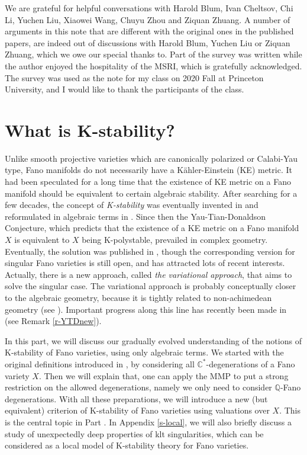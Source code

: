 \documentclass[12pt,reqno]{amsart}%
\theoremstyle{definition}
\theoremstyle{remark}
\begin{document}
\bigskip

 We are grateful for helpful conversations with Harold Blum, Ivan Cheltsov, Chi Li, Yuchen Liu, Xiaowei Wang, Chuyu Zhou and Ziquan Zhuang. A number of arguments in this note that are different with the original ones in the published papers, are indeed out of discussions with Harold Blum, Yuchen Liu or Ziquan Zhuang, which we owe our special thanks to. 
Part of the survey was written while the author enjoyed the hospitality of the MSRI, which is gratefully acknowledged. The survey was  used as the note for my class on 2020 Fall at Princeton University, and I would like to thank the participants of the class. 
\clearpage


\part{What is K-stability?}\label{p-what}
Unlike smooth projective varieties which are canonically polarized or Calabi-Yau type, Fano manifolds do not necessarily have a K\"ahler-Einstein (KE) metric. 
It had been speculated for a long time that the existence of KE metric on a Fano manifold should be equivalent to certain algebraic stability. After searching for a few decades, the concept of {\it K-stability} was eventually invented in \cite{Tia97} and reformulated in algebraic terms in \cite{Don02}. Since then the Yau-Tian-Donaldson Conjecture, which predicts that the existence of a KE metric on a Fano manifold $X$ is equivalent to $X$ being K-polystable, prevailed in complex geometry. Eventually, the solution was published in \cite{CDS, Tia15}, though the corresponding version for singular Fano varieties is still open, and has attracted lots of  recent interests. Actually, there is a new approach, called {\it the variational approach}, that aims to solve the singular case. The variational approach is probably conceptually closer to the algebraic geometry, because it is tightly related to non-achimedean geometry (see \cite{BoJ18}). Important progress along this line has recently been made in \cite{BBJ15, LTW19, Li19} (see Remark \ref{r-YTDnew}). 

In this part, we will discuss our gradually evolved understanding of the notions of K-stability of Fano varieties,  using only algebraic terms. We started with the original definitions introduced in \cite{Tia97, Don02}, by considering all $\mathbb{C}^*$-degenerations of a Fano variety $X$. Then we will explain that, one can apply the MMP to put a strong restriction on the allowed degenerations, namely we only need to consider $\mathbb{Q}$-Fano degenerations. 
With all these preparations, we will introduce a new (but equivalent) criterion of K-stability of Fano varieties using valuations over $X$. This is the central topic in Part \ref{p-what}. In Appendix \ref{s-local}, we will also briefly discuss a study of unexpectedly deep properties of klt singularities, which can be considered as a local model of K-stability theory for Fano varieties. 
\end{document}
